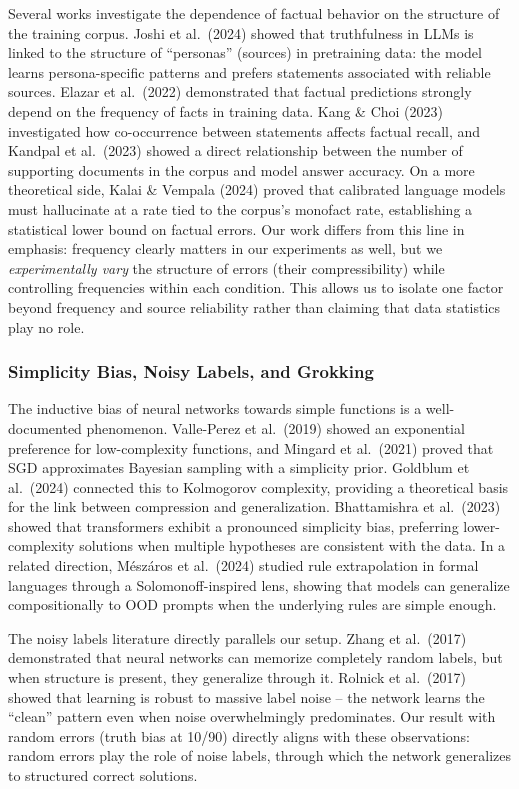 \documentclass[
  11pt,
]{article}
\begin{document}
Several works investigate the dependence of factual behavior on the
structure of the training corpus. Joshi et al.~(2024) showed that
truthfulness in LLMs is linked to the structure of ``personas''
(sources) in pretraining data: the model learns persona-specific
patterns and prefers statements associated with reliable sources. Elazar
et al.~(2022) demonstrated that factual predictions strongly depend on
the frequency of facts in training data. Kang \& Choi (2023)
investigated how co-occurrence between statements affects factual
recall, and Kandpal et al.~(2023) showed a direct relationship between
the number of supporting documents in the corpus and model answer
accuracy. On a more theoretical side, Kalai \& Vempala (2024) proved
that calibrated language models must hallucinate at a rate tied to the
corpus's monofact rate, establishing a statistical lower bound on
factual errors. Our work differs from this line in emphasis: frequency
clearly matters in our experiments as well, but we \emph{experimentally
vary} the structure of errors (their compressibility) while controlling
frequencies within each condition. This allows us to isolate one factor
beyond frequency and source reliability rather than claiming that data
statistics play no role.

\subsubsection{Simplicity Bias, Noisy Labels, and
Grokking}\label{simplicity-bias-noisy-labels-and-grokking}

The inductive bias of neural networks towards simple functions is a
well-documented phenomenon. Valle-Perez et al.~(2019) showed an
exponential preference for low-complexity functions, and Mingard et
al.~(2021) proved that SGD approximates Bayesian sampling with a
simplicity prior. Goldblum et al.~(2024) connected this to Kolmogorov
complexity, providing a theoretical basis for the link between
compression and generalization. Bhattamishra et al.~(2023) showed that
transformers exhibit a pronounced simplicity bias, preferring
lower-complexity solutions when multiple hypotheses are consistent with
the data. In a related direction, Mészáros et al.~(2024) studied rule
extrapolation in formal languages through a Solomonoff-inspired lens,
showing that models can generalize compositionally to OOD prompts when
the underlying rules are simple enough.

The noisy labels literature directly parallels our setup. Zhang et
al.~(2017) demonstrated that neural networks can memorize completely
random labels, but when structure is present, they generalize through
it. Rolnick et al.~(2017) showed that learning is robust to massive
label noise -- the network learns the ``clean'' pattern even when noise
overwhelmingly predominates. Our result with random errors (truth bias
at 10/90) directly aligns with these observations: random errors play
the role of noise labels, through which the network generalizes to
structured correct solutions.
\end{document}
